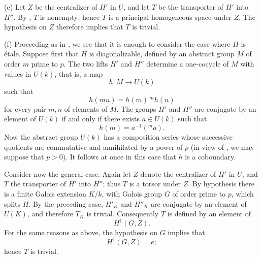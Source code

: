 \smallskip
\noindent
(e) Let \(Z\) be the centralizer of \(H'\) in \(U\), and let \(T\)
be the transporter of \(H'\) into \(H''\).  By , \(T\) is
nonempty; hence \(T\) is a principal homogeneous space under \(Z\).
The hypothesis on \(Z\) therefore implies that \(T\) is trivial.

\smallskip
\noindent
(f) Proceeding as in , we see that it is enough to consider the
case where \(H\) is étale.  Suppose first that \(H\) is
diagonalizable, defined by an abstract group \(M\) of order \(m\)
prime to \(p\).  The two lifts \(H'\) and \(H''\) determine a
one-cocycle of \(M\) with values in \(U(k)\), that is, a map
\[
  h:M\longrightarrow U(k)
\]
such that
\[
  h(mn)=h(m)\,{}^{m}\!h(n)
\]
for every pair \(m,n\) of elements of \(M\).  The groups \(H'\) and
\(H''\) are conjugate by an element of \(U(k)\) if and only if there
exists \(a\in U(k)\) such that
\[
  h(m)=a^{-1}({}^{m}\!a).
\]
Now the abstract group \(U(k)\) has a composition series whose
successive quotients are commutative and annihilated by a power of
\(p\) (in view of , we may suppose that \(p>0\)).  It follows
at once in this case that \(h\) is a coboundary.

Consider now the general case.  Again let \(Z\) denote the
centralizer of \(H'\) in \(U\), and \(T\) the transporter of \(H'\)
into \(H''\); thus \(T\) is a torsor under \(Z\).  By hypothesis there
is a finite Galois extension \(K/k\), with Galois group \(G\) of
order prime to \(p\), which splits \(H\).  By the preceding case,
\(H'_K\) and \(H''_K\) are conjugate by an element of \(U(K)\), and
therefore \(T_K\) is trivial.  Consequently \(T\) is defined by an
element of
\[
  H^1(G,Z).
\]
For the same reasons as above, the hypothesis on \(G\) implies that
\[
  H^1(G,Z)=e;
\]
hence \(T\) is trivial.



